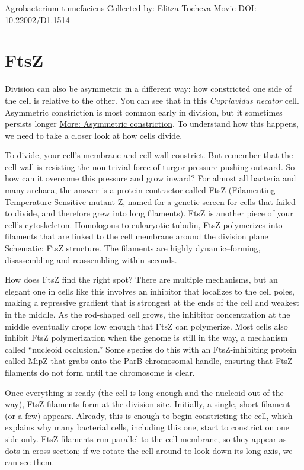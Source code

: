 \documentclass[]{tufte-book}
\begin{document}
\hypertarget{htmlwidget-019c91a410d2ff5f54b3}{}

\label{fig:5-8}\protect\hyperlink{tree}{Agrobacterium tumefaciens} Collected by: \protect\hyperlink{elitza_tocheva}{Elitza Tocheva} Movie DOI: \href{https://doi.org/10.22002/D1.1514}{10.22002/D1.1514}

\hypertarget{ftsz}{%
\section{FtsZ}\label{ftsz}}

Division can also be asymmetric in a different way: how constricted one side of the cell is relative to the other. You can see that in this \emph{Cupriavidus necator} cell. Asymmetric constriction is most common early in division, but it sometimes persists longer \protect\hyperlink{Asymmetric_constriction}{More: Asymmetric constriction}. To understand how this happens, we need to take a closer look at how cells divide.

To divide, your cell's membrane and cell wall constrict. But remember that the cell wall is resisting the non-trivial force of turgor pressure pushing outward. So how can it overcome this pressure and grow inward? For almost all bacteria and many archaea, the answer is a protein contractor called FtsZ (Filamenting Temperature-Sensitive mutant Z, named for a genetic screen for cells that failed to divide, and therefore grew into long filaments). FtsZ is another piece of your cell's cytoskeleton. Homologous to eukaryotic tubulin, FtsZ polymerizes into filaments that are linked to the cell membrane around the division plane \protect\hyperlink{FtsZ_structure}{Schematic: FtsZ structure}. The filaments are highly dynamic--forming, disassembling and reassembling within seconds.

How does FtsZ find the right spot? There are multiple mechanisms, but an elegant one in cells like this involves an inhibitor that localizes to the cell poles, making a repressive gradient that is strongest at the ends of the cell and weakest in the middle. As the rod-shaped cell grows, the inhibitor concentration at the middle eventually drops low enough that FtsZ can polymerize. Most cells also inhibit FtsZ polymerization when the genome is still in the way, a mechanism called ``nucleoid occlusion.'' Some species do this with an FtsZ-inhibiting protein called MipZ that grabs onto the ParB chromosomal handle, ensuring that FtsZ filaments do not form until the chromosome is clear.

Once everything is ready (the cell is long enough and the nucleoid out of the way), FtsZ filaments form at the division site. Initially, a single, short filament (or a few) appears. Already, this is enough to begin constricting the cell, which explains why many bacterial cells, including this one, start to constrict on one side only. FtsZ filaments run parallel to the cell membrane, so they appear as dots in cross-section; if we rotate the cell around to look down its long axis, we can see them.
\end{document}
